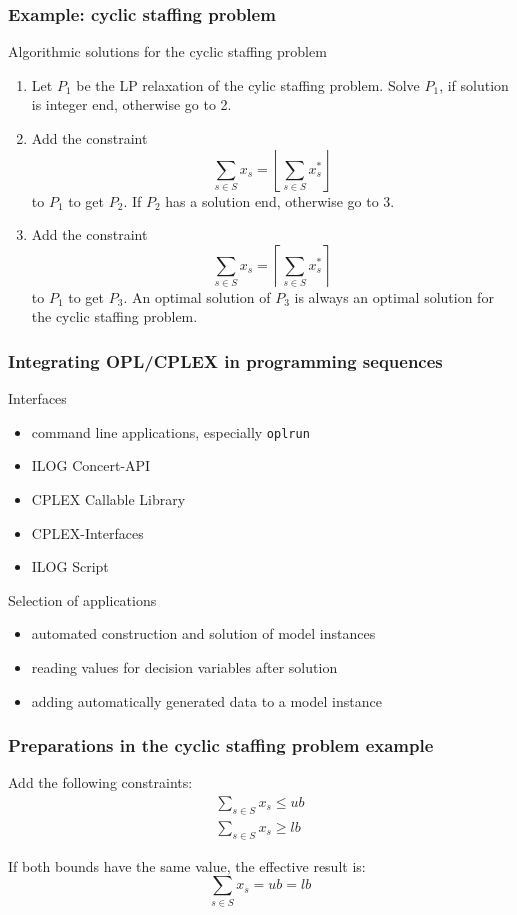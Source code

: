 \begin{frame}
 \frametitle{Example: cyclic staffing problem}
 \begin{block}{Algorithmic solutions for the cyclic staffing problem}\footnotesize
  \begin{enumerate}
   \item Let $P_1$ be the LP relaxation of the cylic staffing problem. Solve $P_1$, if solution is integer end, otherwise go to 2.
   \item Add the constraint \[\sum_{s\in S}x_s = \left\lfloor\sum_{s\in S}x^*_s\right\rfloor\] to $P_1$ to get $P_2$. If $P_2$ has a solution end, otherwise go to 3.
   \item Add the constraint\[\sum_{s\in S}x_s = \left\lceil\sum_{s\in S}x^*_s\right\rceil\] to $P_1$ to get $P_3$. An optimal solution of $P_3$ is always an optimal solution for the cyclic staffing problem.
  \end{enumerate}
 \end{block}
\end{frame}

\begin{frame}
 \frametitle{Integrating OPL/CPLEX in programming sequences}
 \footnotesize
 \begin{block}{Interfaces}
  \begin{itemize}
    \item command line applications, especially \texttt{oplrun}
    \item ILOG Concert-API
    \item CPLEX Callable Library
    \item CPLEX-Interfaces
    \item ILOG Script
  \end{itemize}
 \end{block}
 \pause
 \begin{block}{Selection of applications}
  \begin{itemize}
   \item automated construction and solution of model instances
   \item reading values for decision variables after solution
   \item adding automatically generated data to a model instance
  \end{itemize}
 \end{block}
\end{frame}

\begin{frame}
 \frametitle{Preparations in the cyclic staffing problem example}
 Add the following constraints:
 \begin{gather*}
  \sum_{s\in S}x_s \leq ub\label{eq:CyclicStaffingUB}\\
  \sum_{s\in S}x_s \geq lb\label{eq:CyclicStaffingLB}
 \end{gather*}
 
 If both bounds have the same value, the effective result is:
 \[
  \sum_{s\in S}x_s = ub = lb
 \]
\end{frame}

